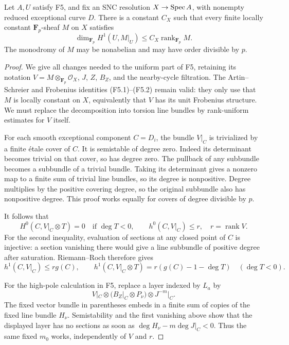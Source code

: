 \begin{proposition}
Let $A,U$ satisfy F5, and fix an SNC resolution $X\to\operatorname{Spec} A$,
with nonempty reduced exceptional curve $D$. There is a constant
$C_X$ such that every finite locally constant $\mathbf F_p$-sheaf
$M$ on $X$ satisfies
\[
 \dim_{\mathbf F_p}H^1(U,M|_U)
       \leq C_X\operatorname{rank}_{\mathbf F_p}M.
\]
The monodromy of $M$ may be nonabelian and may have order divisible
by $p$.
\end{proposition}
\begin{proof}
We give all changes needed to the uniform part of F5, retaining its
notation $V=M\otimes_{\mathbf F_p}\mathcal O_X$, $J$, $Z$, $B_Z$,
and the nearby-cycle filtration. The Artin--Schreier and Frobenius
identities (F5.1)--(F5.2) remain valid: they only use that $M$ is
locally constant on $X$, equivalently that $V$ has its unit
Frobenius structure. We must replace the decomposition into torsion
line bundles by rank-uniform estimates for $V$ itself.

For each smooth exceptional component $C=D_i$, the bundle $V|_C$
is trivialized by a finite \'etale cover of $C$. It is semistable of
degree zero. Indeed its determinant becomes trivial on that cover,
so has degree zero. The pullback of any subbundle becomes a
subbundle of a trivial bundle. Taking its determinant gives a
nonzero map to a finite sum of trivial line bundles, so its degree
is nonpositive. Degree multiplies by the positive covering degree,
so the original subbundle also has nonpositive degree. This proof
works equally for covers of degree divisible by $p$.

It follows that
\[
 H^0(C,V|_C\otimes T)=0\quad\text{if }\deg T<0,
 \qquad h^0(C,V|_C)\leq r,
 \quad r=\operatorname{rank}V.
\]
For the second inequality, evaluation of sections at any closed
point of $C$ is injective: a section vanishing there would give a
line subbundle of positive degree after saturation. Riemann--Roch
therefore gives
\[
 h^1(C,V|_C)\leq r g(C),\qquad
 h^1(C,V|_C\otimes T)=r(g(C)-1-\deg T)\quad(\deg T<0).
 \tag{F7.1}
\]

For the high-pole calculation in F5, replace a layer indexed by
$L_a$ by
\[
 V|_C\otimes(B_Z|_C\otimes P_\nu)\otimes J^{-m}|_C.
\]
The fixed vector bundle in parentheses embeds in a finite sum of
copies of the fixed line bundle $H_\nu$. Semistability and the first
vanishing above show that the displayed layer has no sections as
soon as $\deg H_\nu-m\deg J|_C<0$. Thus the same fixed $m_0$
works, independently of $V$ and $r$.


\end{proof}
